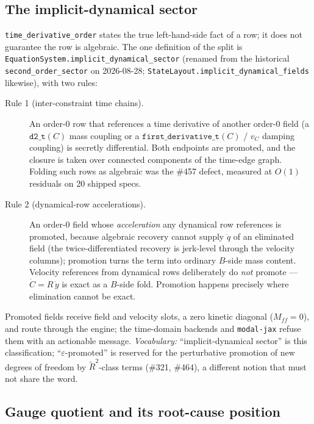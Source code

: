 \subsection{The implicit-dynamical sector}
\label{sec:pencil-classification}

\texttt{time\_derivative\_order} states the true left-hand-side fact of a
row; it does not guarantee the row is algebraic. The one definition of
the split is \texttt{EquationSystem.implicit\_dynamical\_sector} (renamed from the
historical \texttt{second\_order\_sector} on 2026-08-28;
\texttt{StateLayout.implicit\_dynamical\_fields} likewise), with two
rules:

\begin{description}
  \item[Rule 1 (inter-constraint time chains).] An order-0 row that
    references a time derivative of another order-0 field (a
    $\texttt{d2\_t}(C)$ mass coupling or a $\texttt{first\_derivative\_t}(C)$ /
    $v_C$ damping coupling) is secretly differential. Both endpoints are
    promoted, and the closure is taken over connected components of the
    time-edge graph. Folding such rows as algebraic was the \#457 defect,
    measured at $O(1)$ residuals on 20 shipped specs.
  \item[Rule 2 (dynamical-row accelerations).] An order-0 field whose
    \emph{acceleration} any dynamical row references is promoted, because
    algebraic recovery cannot supply $\ddot q$ of an eliminated field
    (the twice-differentiated recovery is jerk-level through the velocity
    columns); promotion turns the term into ordinary $B$-side mass
    content. Velocity references from dynamical rows deliberately do
    \emph{not} promote --- $\dot C = R\,\dot y$ is exact as a $B$-side
    fold. Promotion happens precisely where elimination cannot be exact.
\end{description}

Promoted fields receive field and velocity slots, a zero kinetic
diagonal ($M_{ff} = 0$), and route through the engine; the time-domain
backends and \texttt{modal-jax} refuse them with an actionable message.
\emph{Vocabulary:} ``implicit-dynamical sector'' is this classification;
``$\varepsilon$-promoted'' is reserved for the perturbative promotion of
new degrees of freedom by $\tilde R^2$-class terms (\#321, \#464), a
different notion that must not share the word.

\subsection{Gauge quotient and its root-cause position}
\label{sec:pencil-quotient}

